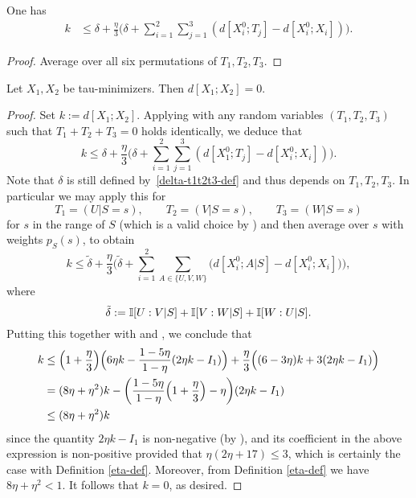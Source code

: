 \begin{lemma}\label{construct-good}
  \leanok
One has
\begin{align*}  k & \leq  \delta + \frac{\eta}{3} \biggl( \delta + \sum_{i=1}^2 \sum_{j = 1}^3 (d[X^0_i;T_j] - d[X^0_i; X_i]) \biggr).
  \end{align*}
\end{lemma}

\begin{proof}
\leanok
Average  over all six permutations of $T_1,T_2,T_3$.
\end{proof}




\begin{theorem}\label{de-prop}
  \leanok
  Let $X_1, X_2$ be tau-minimizers.  Then $d[X_1;X_2] = 0$.
\end{theorem}

\begin{proof}
  \leanok
  Set $k := d[X_1;X_2]$.  Applying  with any random variables $(T_1,T_2,T_3)$ such that $T_1+T_2+T_3=0$ holds identically, we deduce that
\[
  k \leq \delta + \frac{\eta}{3} \biggl( \delta + \sum_{i=1}^2 \sum_{j = 1}^3 (d[X^0_1;T_j] - d[X^0_i;X_i]) \biggr).
\]
Note that $\delta$ is still defined by~\eqref{delta-t1t2t3-def} and thus depends on $T_1,T_2,T_3$.
In particular we may apply this for
\[
  T_1 = (U | S = s),\qquad T_2 = (V | S = s), \qquad T_3 = (W | S = s)
\]
for $s$ in the range of $S$ (which is a valid choice by ) and then average over $s$ with weights $p_S(s)$, to obtain
\[k \leq \tilde \delta + \frac{\eta}{3} \biggl( \tilde \delta + \sum_{i=1}^2 \sum_{A\in\{U,V,W\}} \bigl(  d[X^0_i;A|S] - d[X^0_i;X_i]\bigr) \biggr),\]
where
\[
  \tilde \delta :=  \mathbb{I}[U : V | S] + \mathbb{I}[V : W | S] + \mathbb{I}[W : U | S].
\]
Putting this together with  and , we conclude that
\begin{align*}
  k &\leq \Bigl(1+\frac{\eta}{3}\Bigr)\Bigl(6\eta k-\frac{1-5\eta}{1-\eta}(2\eta k-I_1)\Bigr)+\frac{\eta}{3}\Bigl((6-3\eta)k+3(2\eta k-I_1)\Bigr)\\
  &= (8\eta + \eta^2) k - \biggl( \frac{1 - 5 \eta}{1-\eta}\Bigl(1 + \frac{\eta}{3}\Bigr) -  \eta \biggr)(2 \eta k - I_1)\\
  &\leq (8 \eta + \eta^2) k
 \end{align*}
since the quantity $2 \eta k - I_1$ is non-negative (by ), and its coefficient in the above expression is non-positive provided that $\eta(2\eta + 17) \le 3$, which is certainly the case with Definition \ref{eta-def}.
Moreover, from Definition \ref{eta-def} we have $8 \eta + \eta^2 < 1$. It follows that $k=0$, as desired.
\end{proof}


